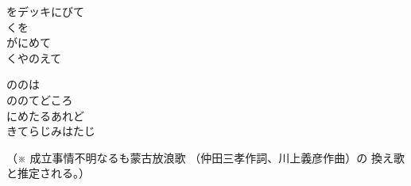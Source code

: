\documentclass[10pt,b5j]{tarticle} %
\begin{document}
\begin{enumerate}
\begin{minipage}[c]{\blocksize}
        \vspace{\linespace}
        \item
        をデッキにびて\\
        くを\\
        がにめて\\
        くやのえて
        
        \vspace{\linespace}
        \item
        ののは\\
        ののてどころ\\
        にめたるあれど\\
        きてらじみはたじ
        
        （※
        成立事情不明なるも蒙古放浪歌
        （仲田三孝作詞、川上義彦作曲）の
        換え歌と推定される。）

    
    \end{minipage}
\end{enumerate} %
\end{document}
